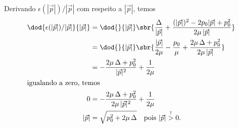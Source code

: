 \documentclass[]{IMTexam}
\begin{document}
\begin{questions}
\begin{parts}

		\begin{solution}
			Derivando $ \epsilon(|\vec{p}|)/|\vec{p}| $ com respeito a $ |\vec{p}| $, temos
			\begin{align*}
				\dod{\epsilon(|\vec{p}|)/|\vec{p}|}{|\vec{p}|} & =\dod{}{|\vec{p}|}\sbr{\dfrac{\Delta}{|\vec{p}|}+ \dfrac{(|\vec{p}|)^{2}-2p_0|\vec{p}|+p_0^{2}}{2\mu\,|\vec{p}|}} \\
				                                               & =\dod{}{|\vec{p}|}\sbr{\dfrac{|\vec{p}|}{2\mu}-\dfrac{p_0}{\mu}+\dfrac{2\mu\,\Delta+p_0^{2}}{2\mu\,|\vec{p}|}}    \\
				                                               & =-\dfrac{2\mu\,\Delta+p_0^{2}}{|\vec{p}|^{2}}+\dfrac{1}{2\mu}                                                     \\
				\intertext{igualando a zero, temos}
				0                                              & =-\dfrac{2\mu\,\Delta+p_0^{2}}{2\mu\,|\vec{p}|^{2}}+\dfrac{1}{2\mu}                                               \\
				|\vec{p}|                                      & =\sqrt{p_0^{2}+2\mu\,\Delta}\quad\text{pois $ |\vec{p}|\stackrel{!}{>}0 $.}
			\end{align*}


\end{solution}
\end{parts}
\end{questions}
\end{document}
